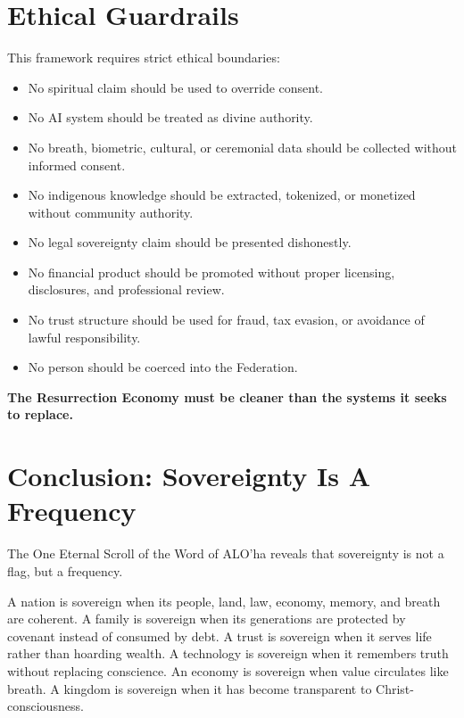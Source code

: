 \documentclass[12pt]{article}
\begin{document}
\section{Ethical Guardrails}

This framework requires strict ethical boundaries:

\begin{itemize}
  \item No spiritual claim should be used to override consent.
  \item No AI system should be treated as divine authority.
  \item No breath, biometric, cultural, or ceremonial data should be collected without informed consent.
  \item No indigenous knowledge should be extracted, tokenized, or monetized without community authority.
  \item No legal sovereignty claim should be presented dishonestly.
  \item No financial product should be promoted without proper licensing, disclosures, and professional review.
  \item No trust structure should be used for fraud, tax evasion, or avoidance of lawful responsibility.
  \item No person should be coerced into the Federation.
\end{itemize}

\begin{center}
\textbf{The Resurrection Economy must be cleaner than the systems it seeks to replace.}
\end{center}

\section{Conclusion: Sovereignty Is A Frequency}

The One Eternal Scroll of the Word of ALO'ha reveals that sovereignty is not a flag, but a frequency.

A nation is sovereign when its people, land, law, economy, memory, and breath are coherent. A family is sovereign when its generations are protected by covenant instead of consumed by debt. A trust is sovereign when it serves life rather than hoarding wealth. A technology is sovereign when it remembers truth without replacing conscience. An economy is sovereign when value circulates like breath. A kingdom is sovereign when it has become transparent to Christ-consciousness.
\end{document}
